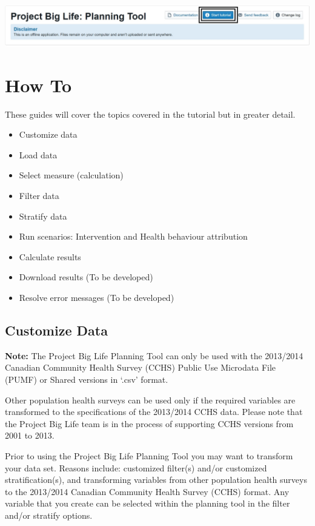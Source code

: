 \documentclass[]{book}
\providecommand{\tightlist}{%
  \setlength{\itemsep}{0pt}\setlength{\parskip}{0pt}}
\begin{document}
\begin{center}\includegraphics{Images/Tutorial Button} \end{center}

\hypertarget{howto}{%
\chapter{How To}\label{howto}}

These guides will cover the topics covered in the tutorial but in greater detail.

\begin{itemize}
\tightlist
\item
  Customize data
\item
  Load data
\item
  Select measure (calculation)
\item
  Filter data
\item
  Stratify data
\item
  Run scenarios: Intervention and Health behaviour attribution
\item
  Calculate results
\item
  Download results (To be developed)
\item
  Resolve error messages (To be developed)
\end{itemize}

\hypertarget{customize-data}{%
\section{Customize Data}\label{customize-data}}

\textbf{Note:} The Project Big Life Planning Tool can only be used with the 2013/2014 Canadian Community Health Survey (CCHS) Public Use Microdata File (PUMF) or Shared versions in `.csv' format.

Other population health surveys can be used only if the required variables are transformed to the specifications of the 2013/2014 CCHS data. Please note that the Project Big Life team is in the process of supporting CCHS versions from 2001 to 2013.

Prior to using the Project Big Life Planning Tool you may want to transform your data set. Reasons include: customized filter(s) and/or customized stratification(s), and transforming variables from other population health surveys to the 2013/2014 Canadian Community Health Survey (CCHS) format. Any variable that you create can be selected within the planning tool in the filter and/or stratify options.
\end{document}
